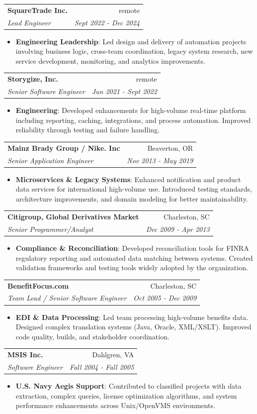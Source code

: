 \documentclass[letterpaper,10pt]{article}
\makeatletter
\newcommand{\resumeItem}[2]{
  \item\small{
    \textbf{#1}{: #2 \vspace{-2pt}}
  }
}
\newcommand{\resumeSubheading}[4]{
  \vspace{-1pt}\item[]
  \begin{tabular*}{0.98\textwidth}{l@{\extracolsep{\fill}}r}
      \hspace{-10pt}\textbf{#1} & #2 \\
      \hspace{-10pt}\textit{\small#3} & \textit{\small #4} \\
    \end{tabular*}\vspace{-5pt}
}
\newcommand{\resumeItemListStart}{\begin{itemize}}
\newcommand{\resumeItemListEnd}{\end{itemize}\vspace{-5pt}}
\makeatother
\begin{document}
    \resumeSubheading
        {SquareTrade Inc.}{remote}
        {Lead Engineer}{Sept 2022 - Dec 2024}
        \resumeItemListStart
        \resumeItem{Engineering Leadership}
            {Led design and delivery of automation projects involving business logic, cross-team coordination, legacy system research, new service development, monitoring, and analytics improvements.}
        \resumeItemListEnd

    \resumeSubheading
      {Storygize, Inc.}{remote}
      {Senior Software Engineer}{Jun 2021 - Sept 2022}
      \resumeItemListStart
        \resumeItem{Engineering}
          {Developed enhancements for high-volume real-time platform including reporting, caching, integrations, and process automation. Improved reliability through testing and failure handling.}
      \resumeItemListEnd

    \resumeSubheading
      {Mainz Brady Group / Nike. Inc}{Beaverton, OR}
      {Senior Application Engineer}{Nov 2013 - May 2019}
      \resumeItemListStart
        \resumeItem{Microservices \& Legacy Systems}
          {Enhanced notification and product data services for international high-volume use. Introduced testing standards, architecture improvements, and domain modeling for better maintainability.}
      \resumeItemListEnd

    \resumeSubheading
      {Citigroup, Global Derivatives Market}{Charleston, SC}
      {Senior Programmer/Analyst}{Dec 2009 - Apr 2013}
      \resumeItemListStart
        \resumeItem{Compliance \& Reconciliation}
          {Developed reconciliation tools for FINRA regulatory reporting and automated data matching between systems. Created validation frameworks and testing tools widely adopted by the organization.}
      \resumeItemListEnd

    \resumeSubheading
      {BenefitFocus.com}{Charleston, SC}
      {Team Lead / Senior Software Engineer}{Oct 2005 - Dec 2009}
      \resumeItemListStart
        \resumeItem{EDI \& Data Processing}
          {Led team processing high-volume benefits data. Designed complex translation systems (Java, Oracle, XML/XSLT). Improved code quality, builds, and stakeholder coordination.}
      \resumeItemListEnd

    \resumeSubheading
      {MSIS Inc.}{Dahlgren, VA}
      {Software Engineer}{Fall 2004 - Fall 2005}
      \resumeItemListStart
        \resumeItem{U.S. Navy Aegis Support}
          {Contributed to classified projects with data extraction, complex queries, license optimization algorithms, and system performance enhancements across Unix/OpenVMS environments.}
      \resumeItemListEnd
\end{document}
